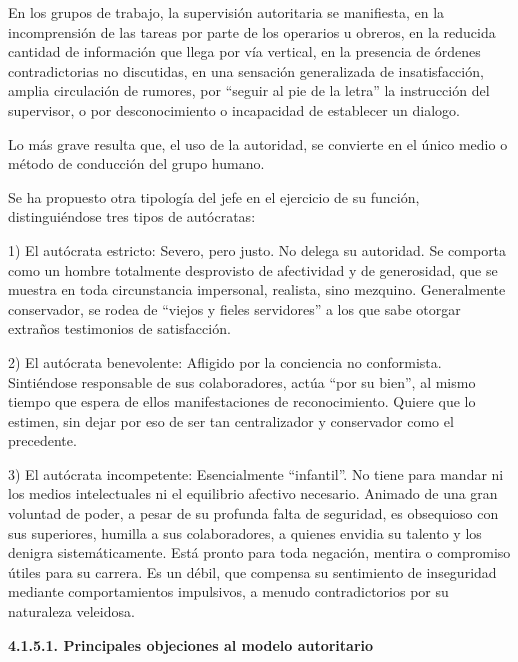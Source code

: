 En los grupos de trabajo, la supervisión autoritaria se manifiesta, en la incomprensión de las tareas por parte de los operarios u obreros, en la reducida cantidad de información que llega por vía vertical, en la presencia de órdenes contradictorias no discutidas, en una sensación generalizada de insatisfacción, amplia circulación de rumores, por “seguir al pie de la letra” la instrucción del supervisor, o por desconocimiento o incapacidad de establecer un dialogo.

Lo más grave resulta que, el uso de la autoridad, se convierte en el único medio o método de conducción del grupo humano.

Se ha propuesto otra tipología del jefe en el ejercicio de su función, distinguiéndose tres tipos de autócratas:

1) El autócrata estricto: Severo, pero justo. No delega su autoridad. Se comporta como un hombre totalmente desprovisto de afectividad y de generosidad, que se muestra en toda circunstancia impersonal, realista, sino mezquino. Generalmente conservador, se rodea de “viejos y fieles servidores” a los que sabe otorgar extraños testimonios de satisfacción.

2) El autócrata benevolente: Afligido por la conciencia no conformista. Sintiéndose responsable de sus colaboradores, actúa “por su bien”, al mismo tiempo que espera de ellos manifestaciones de reconocimiento. Quiere que lo estimen, sin dejar por eso de ser tan centralizador y conservador como el precedente.

3) El autócrata incompetente: Esencialmente “infantil”. No tiene para mandar ni los medios intelectuales ni el equilibrio afectivo necesario. Animado de una gran voluntad de poder, a pesar de su profunda falta de seguridad, es obsequioso con sus superiores, humilla a sus colaboradores, a quienes envidia su talento y los denigra sistemáticamente. Está pronto para toda negación, mentira o compromiso útiles para su carrera. Es un débil, que compensa su sentimiento de inseguridad mediante comportamientos impulsivos, a menudo contradictorios por su naturaleza veleidosa.

\textbf{4.1.5.1. Principales objeciones al modelo autoritario}




